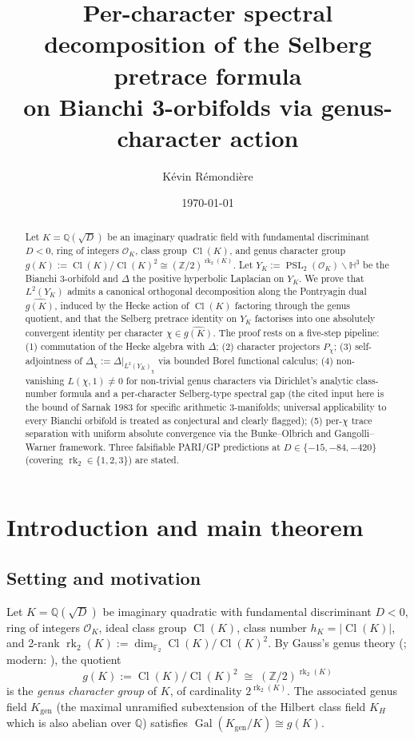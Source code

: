 \documentclass[11pt,a4paper,reqno]{amsart}
\title[Per-character Selberg decomposition on Bianchi orbifolds]{%
Per-character spectral decomposition of the Selberg pretrace formula\\
on Bianchi 3-orbifolds via genus-character action}
\author{K\'evin R\'emondi\`ere}
\date{\today}
\theoremstyle{definition}
\DeclareMathOperator{\PSL}{PSL}
\DeclareMathOperator{\Cl}{Cl}
\DeclareMathOperator{\Gal}{Gal}
\DeclareMathOperator{\rk}{rk}
\newcommand{\OK}{\mathcal{O}_K}
\newcommand{\HH}{\mathbb{H}}
\newcommand{\QQ}{\mathbb{Q}}
\newcommand{\ZZ}{\mathbb{Z}}
\newcommand{\FF}{\mathbb{F}}
\newcommand{\YK}{Y_K}
\newcommand{\gK}{g(K)}
\newcommand{\dualgK}{\widehat{g(K)}}
\newcommand{\Kgen}{K_{\mathrm{gen}}}
\newcommand{\KH}{K_H}
\begin{document}
\begin{abstract}
Let $K=\QQ(\sqrt{D})$ be an imaginary quadratic field with fundamental discriminant $D<0$, ring of integers $\OK$, class group $\Cl(K)$, and genus character group $\gK := \Cl(K)/\Cl(K)^2 \cong (\ZZ/2)^{\rk_2(K)}$. Let $\YK := \PSL_2(\OK)\backslash\HH^3$ be the Bianchi 3-orbifold and $\Delta$ the positive hyperbolic Laplacian on $\YK$. We prove that $L^2(\YK)$ admits a canonical orthogonal decomposition along the Pontryagin dual $\dualgK$, induced by the Hecke action of $\Cl(K)$ factoring through the genus quotient, and that the Selberg pretrace identity on $\YK$ factorises into one absolutely convergent identity per character $\chi\in\dualgK$. The proof rests on a five-step pipeline: (1) commutation of the Hecke algebra with $\Delta$; (2) character projectors $P_\chi$; (3) self-adjointness of $\Delta_\chi := \Delta\big|_{L^2(\YK)_\chi}$ via bounded Borel functional calculus; (4) non-vanishing $L(\chi,1)\neq 0$ for non-trivial genus characters via Dirichlet's analytic class-number formula and a per-character Selberg-type spectral gap (the cited input here is the bound of Sarnak 1983 for specific arithmetic 3-manifolds; universal applicability to every Bianchi orbifold is treated as conjectural and clearly flagged); (5) per-$\chi$ trace separation with uniform absolute convergence via the Bunke--Olbrich and Gangolli--Warner framework. Three falsifiable PARI/GP predictions at $D\in\{-15,-84,-420\}$ (covering $\rk_2\in\{1,2,3\}$) are stated.
\end{abstract}

\maketitle

\section{Introduction and main theorem}\label{sec:intro}

\subsection{Setting and motivation}\label{ss:motivation}

Let $K=\QQ(\sqrt{D})$ be imaginary quadratic with fundamental discriminant $D<0$, ring of integers $\OK$, ideal class group $\Cl(K)$, class number $h_K=|\Cl(K)|$, and 2-rank $\rk_2(K) := \dim_{\FF_2}\Cl(K)/\Cl(K)^2$. By Gauss's genus theory (\cite[Disquisitiones \S\S246--262]{Gauss1801}; modern: \cite[Thm.~7.7]{Cox1989}), the quotient
\[
  \gK := \Cl(K)/\Cl(K)^2 \;\cong\; (\ZZ/2)^{\rk_2(K)}
\]
is the \emph{genus character group} of $K$, of cardinality $2^{\rk_2(K)}$. The associated genus field $\Kgen$ (the maximal unramified subextension of the Hilbert class field $\KH$ which is also abelian over $\QQ$) satisfies $\Gal(\Kgen/K)\cong\gK$.
\end{document}
